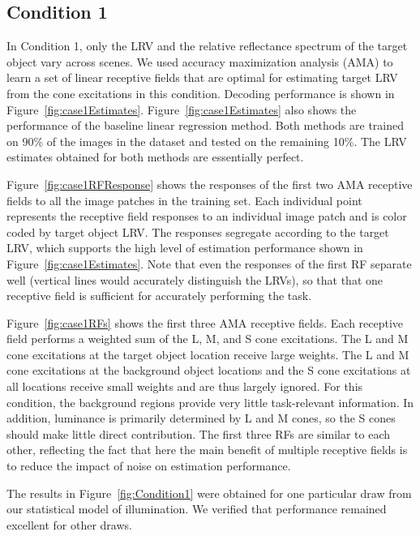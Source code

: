 \documentclass{jov}
\begin{document}
\subsection{Condition 1}
In Condition 1, only the LRV and the relative reflectance spectrum of the target object vary across scenes.
We used accuracy maximization analysis (AMA) to learn a set of linear receptive fields that are optimal for estimating target LRV from the cone excitations in this condition. 
Decoding performance is shown in Figure~\ref{fig:case1Estimates}. 
Figure~\ref{fig:case1Estimates} also shows the performance of the baseline linear regression method. 
Both methods are trained on 90\% of the images in the dataset and tested on the remaining 10\%.
The LRV estimates obtained for both methods are essentially perfect.

Figure~\ref{fig:case1RFResponse} shows the responses of the first two AMA receptive fields to all the image patches in the training set.
Each individual point represents the receptive field responses to an individual image patch and
is color coded by target object LRV.
The responses segregate according to the target LRV, which supports the high level 
of estimation performance shown in Figure~\ref{fig:case1Estimates}.
Note that even the responses of the first RF separate well (vertical lines would accurately
distinguish the LRVs), so that that one receptive field is sufficient for accurately performing the task.

Figure~\ref{fig:case1RFs} shows the first three AMA receptive fields.
Each receptive field performs a weighted sum of the L, M, and S cone excitations.
The L and M cone excitations at the target object location receive large weights.
The L and M cone excitations at the background object locations and the S cone excitations at all locations receive small weights and are thus largely ignored. 
For this condition, the background regions provide very little task-relevant information. 
In addition, luminance is primarily determined by L and M cones, so the S cones should make little
direct contribution.
The first three RFs are similar to each other, reflecting the fact that here the main benefit
of multiple receptive fields is to reduce the impact of noise on estimation performance.

The results in Figure~\ref{fig:Condition1} were obtained for one particular draw from our statistical model of illumination.
We verified that performance remained excellent for other draws.
\end{document}
